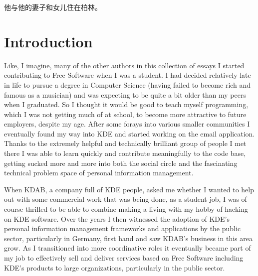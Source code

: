 
他与他的妻子和女儿住在柏林。
\section*{Introduction}

Like, I imagine, many of the other authors in this collection of essays I
started contributing to Free Software when I was a student. I had decided
relatively late in life to pursue a degree in Computer Science (having failed
to become rich and famous as a musician) and was expecting to be quite
a bit older than my peers when I graduated. So I thought it would be good
to teach myself programming, which I was not getting much of at
school, to become more attractive to future employers, despite my age.
After some forays into various smaller communities I eventually found my way
into KDE and started working on the email application. Thanks to
the extremely helpful and technically brilliant group of people I met there I
was able to learn quickly and contribute meaningfully to the code base, getting
sucked more and more into both the social circle and the fascinating technical
problem space of personal information management.

When KDAB, a company full of KDE people, asked me whether I wanted to help out
with some commercial work that was being done, as a student job, I was of
course thrilled to be able to combine making a living with my hobby of hacking
on KDE software. Over the years I then witnessed the adoption of KDE's personal
information management frameworks and applications by the public sector,
particularly in Germany, first hand and saw KDAB's business in this area grow.
As I transitioned into more coordinative roles it eventually became part of my
job to effectively sell and deliver services based on Free Software including KDE's products
to large organizations, particularly in the public sector.

